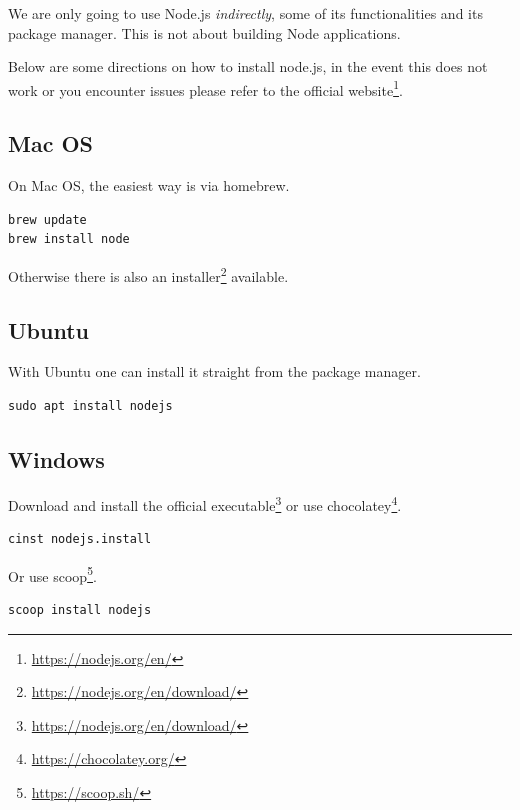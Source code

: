 \documentclass[
]{krantz}
\makeatletter
\renewcommand{\href}[2]{#2\footnote{\url{#1}}}
\newenvironment{kframe}{%
\medskip{}
\setlength{\fboxsep}{.8em}
 \def\at@end@of@kframe{}%
 \ifinner\ifhmode%
  \def\at@end@of@kframe{\end{minipage}}%
  \begin{minipage}{\columnwidth}%
 \fi\fi%
 \def\FrameCommand##1{\hskip\@totalleftmargin \hskip-\fboxsep
 \colorbox{shadecolor}{##1}\hskip-\fboxsep
     \hskip-\linewidth \hskip-\@totalleftmargin \hskip\columnwidth}%
 \MakeFramed {\advance\hsize-\width
   \@totalleftmargin\z@ \linewidth\hsize
   \@setminipage}}%
 {\par\unskip\endMakeFramed%
 \at@end@of@kframe}
\newenvironment{rmdblock}[1]
  {
  \begin{itemize}
  \renewcommand{\labelitemi}{
    \raisebox{-.7\height}[0pt][0pt]{
      {\setkeys{Gin}{width=3em,keepaspectratio}\texttt{[image: images/\#1]}}
    }
  }
  \setlength{\fboxsep}{1em}
  \begin{kframe}
  \item
  }
  {
  \end{kframe}
  \end{itemize}
  }
\newenvironment{rmdnote}
  {\begin{rmdblock}{note}}
  {\end{rmdblock}}
\makeatother
\begin{document}
\begin{rmdnote}
We are only going to use Node.js \emph{indirectly}, some of its
functionalities and its package manager. This is not about building Node
applications.
\end{rmdnote}

Below are some directions on how to install node.js, in the event this does not work or you encounter issues please refer to the \href{https://nodejs.org/en/}{official website}.

\hypertarget{webpack-intro-install-mac}{%
\subsection{Mac OS}\label{webpack-intro-install-mac}}

On Mac OS, the easiest way is via homebrew.

\begin{verbatim}
brew update
brew install node
\end{verbatim}

Otherwise there is also an \href{https://nodejs.org/en/download/}{installer} available.

\hypertarget{webpack-intro-install-ubuntu}{%
\subsection{Ubuntu}\label{webpack-intro-install-ubuntu}}

With Ubuntu one can install it straight from the package manager.

\begin{verbatim}
sudo apt install nodejs
\end{verbatim}

\hypertarget{webpack-intro-install-windows}{%
\subsection{Windows}\label{webpack-intro-install-windows}}

Download and install the official \href{https://nodejs.org/en/download/}{executable} or use \href{https://chocolatey.org/}{chocolatey}.

\begin{verbatim}
cinst nodejs.install
\end{verbatim}

Or use \href{https://scoop.sh/}{scoop}.

\begin{verbatim}
scoop install nodejs
\end{verbatim}
\end{document}
